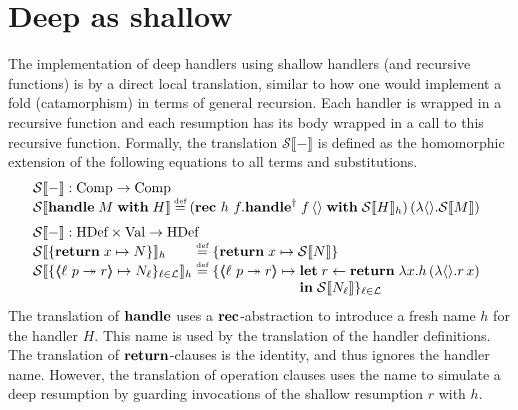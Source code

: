 \documentclass[12pt,phd,lfcs,twoside,openright,logo,leftchapter,normalheadings]{infthesis}
\theoremstyle{plain}
\theoremstyle{definition}
\begin{document}
\section{Deep as shallow}
\label{sec:deep-as-shallow}

\newcommand{\dstrans}[1]{\mathcal{S}\llbracket #1 \rrbracket}

The implementation of deep handlers using shallow handlers (and
recursive functions) is by a direct local translation, similar to how
one would implement a fold (catamorphism) in terms of general
recursion. Each handler is wrapped in a recursive function and each
resumption has its body wrapped in a call to this recursive function.
%
Formally, the translation $\dstrans{-}$ is defined as the homomorphic
extension of the following equations to all terms and substitutions.
%
\[
\bl
  \dstrans{-} : \CompCat \to \CompCat\\
  \dstrans{\Handle \; M \; \With \; H} \defas
      (\Rec~h~f.\ShallowHandle\; f\,\Unit \; \With \; \dstrans{H}_h)\,(\lambda \Unit{}.\dstrans{M}) \medskip\\
  \dstrans{-} : \HandlerCat \times \ValCat \to \HandlerCat\\
  \ba{@{}l@{~}c@{~}l}
    \dstrans{\{ \Return \; x \mapsto N\}}_h &\defas&
      \{ \Return \; x \mapsto \dstrans{N} \}\\
    \dstrans{\{ \OpCase{\ell}{p}{r} \mapsto N_\ell \}_{\ell \in \mathcal{L}}}_h &\defas&
      \{ \OpCase{\ell}{p}{r} \mapsto
           \bl
             \Let \; r \revto \Return \; \lambda x.h\,(\lambda \Unit{}.r\,x)\\
             \In\;\dstrans{N_\ell} \}_{\ell \in \mathcal{L}}
           \el
  \ea
\el
\]
%
The translation of $\mathbf{handle}$ uses a $\mathbf{rec}$-abstraction to introduce a
fresh name $h$ for the handler $H$. This name is used by the
translation of the handler definitions. The translation of
$\mathbf{return}$-clauses is the identity, and thus ignores the handler
name. However, the translation of operation clauses uses the name to
simulate a deep resumption by guarding invocations of the shallow
resumption $r$ with $h$.
\end{document}
